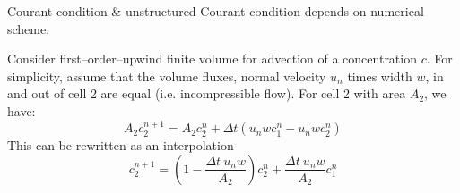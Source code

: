 \documentclass[12pt]{beamer}
\begin{document}
\begin{frame}{Courant condition \& unstructured}
  Courant condition depends on numerical scheme.
  \begin{example}
    \small
    \begin{minipage}{0.7\textwidth}
      Consider first--order--upwind finite volume for advection
      of a concentration $c$. For simplicity, assume that the
      volume fluxes, normal velocity $u_n$ times width $w$,
      in and out of cell 2 are equal (i.e.
      incompressible flow). For cell 2 with area $A_2$, we have:
      \begin{equation*}
        A_2 c^{n+1}_2 = A_2 c^n_2 + \Delta t \left(u_n w c^n_1-u_n w c^n_2\right)
      \end{equation*}
      This can be rewritten as an interpolation
      \begin{equation*}
        c^{n+1}_2 = \left(1-\frac{\Delta t~u_n w}{A_2}\right) c^n_2
        +\frac{\Delta t~u_n w}{A_2} c^n_1
      \end{equation*}
    \end{minipage}%
    \begin{minipage}{0.3\textwidth}

\end{minipage}
\end{example}
\end{frame}
\end{document}
